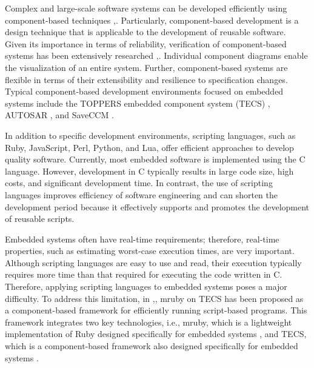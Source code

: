 \documentclass[a4j,12pt,oneside,openany,english]{jsbook}
\begin{document}
Complex and large-scale software systems can be developed efficiently using component-based techniques \cite{par:Crnkovic},\cite{par:CBD}.
Particularly, component-based development is a design technique that is applicable to the development of reusable software.
Given its importance in terms of reliability, verification of component-based systems has been extensively researched \cite{par:Blaming},\cite{par:Verification}.
Individual component diagrams enable the visualization of an entire system.
Further, component-based systems are flexible in terms of their extensibility and resilience to specification changes.
Typical component-based development environments focused on embedded systems include the TOPPERS embedded component system (TECS) \cite{par:TECS}, AUTOSAR \cite{url:AUTOSAR}, and SaveCCM \cite{par:SAVEapproach}.

In addition to specific development environments, scripting languages, such as Ruby, JavaScript, Perl, Python, and Lua, offer efficient approaches to develop quality software.
Currently, most embedded software is implemented using the C language.
However, development in C typically results in large code size, high costs, and significant development time.
In contrast, the use of scripting languages improves efficiency of software engineering and can shorten the development period because it effectively supports and promotes the development of reusable scripts. 

Embedded systems often have real-time requirements; therefore, real-time properties, such as estimating worst-case execution times, are very important.
Although scripting languages are easy to use and read, their execution typically requires more time than that required for executing the code written in C.
Therefore, applying scripting languages to embedded systems poses a major difficulty.
To address this limitation, in \cite{par:mrubyonTECS},\cite{par:mrubyonTECS3}, mruby on TECS has been proposed as a component-based framework for efficiently running script-based programs.
This framework integrates two key technologies, i.e., mruby, which is a lightweight implementation of Ruby designed specifically for embedded systems \cite{par:mruby},\cite{url:mruby} and TECS, which is a component-based framework also designed specifically for embedded systems \cite{par:TECS}.
\end{document}
